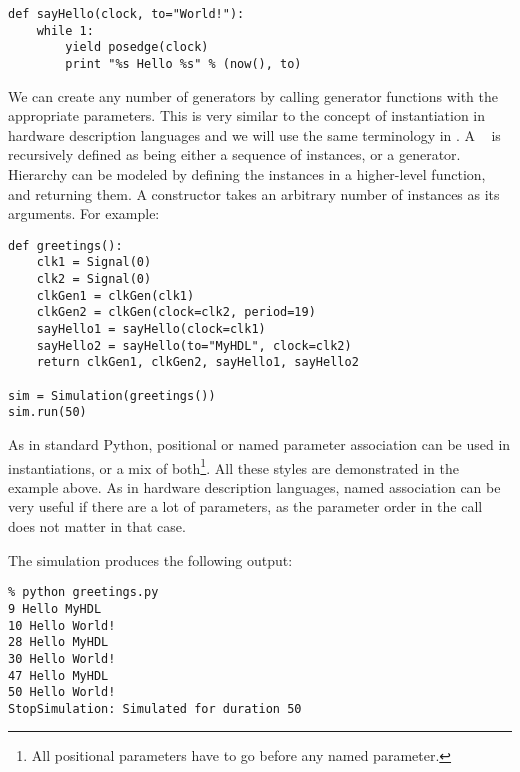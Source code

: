 \begin{verbatim}
def sayHello(clock, to="World!"):
    while 1:
        yield posedge(clock)
        print "%s Hello %s" % (now(), to)
\end{verbatim}

We can create any number of generators by calling generator functions
with the appropriate parameters. This is very similar to the concept
of instantiation in hardware description languages and we will use
the same terminology in \myhdl{}. A \myhdl\  is
recursively defined as being either a sequence of instances, or a
generator.  Hierarchy can be modeled by defining the instances in a
higher-level function, and returning them. 
A  constructor takes an arbitrary number of
instances as its arguments.
For example:

\begin{verbatim}
def greetings():
    clk1 = Signal(0)
    clk2 = Signal(0)
    clkGen1 = clkGen(clk1)
    clkGen2 = clkGen(clock=clk2, period=19)
    sayHello1 = sayHello(clock=clk1)
    sayHello2 = sayHello(to="MyHDL", clock=clk2)
    return clkGen1, clkGen2, sayHello1, sayHello2

sim = Simulation(greetings())
sim.run(50)
\end{verbatim}

As in standard Python, positional or named parameter association can
be used in instantiations, or a mix of both\footnote{All positional
parameters have to go before any named parameter.}. All these styles
are demonstrated in the example above. As in hardware description
languages, named association can be very useful if there are a lot of
parameters, as the parameter order in the call does not matter in that
case.

The simulation produces the following output:

\begin{verbatim}
% python greetings.py
9 Hello MyHDL
10 Hello World!
28 Hello MyHDL
30 Hello World!
47 Hello MyHDL
50 Hello World!
StopSimulation: Simulated for duration 50
\end{verbatim}


